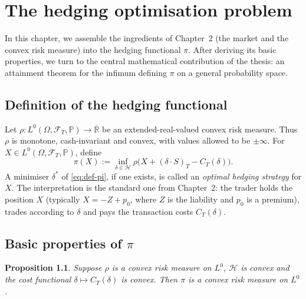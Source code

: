 \documentclass[11pt,a4paper]{report}
\numberwithin{equation}{chapter}
\theoremstyle{plain}
\newtheorem{proposition}{Proposition}[chapter]
\theoremstyle{definition}
\newcommand{\PP}{\mathbb{P}}
\newcommand{\R}{\mathbb{R}}
\newcommand{\F}{\mathcal{F}}
\newcommand{\HH}{\mathcal{H}}
\begin{document}
\setcounter{chapter}{2}

\chapter{The hedging optimisation problem}

In this chapter, we assemble the ingredients of Chapter~2 (the market and the convex risk measure) into the hedging functional $\pi$. After deriving its basic properties, we turn to the central mathematical contribution of the thesis: an attainment theorem for the infimum defining $\pi$ on a general probability space.

\section{Definition of the hedging functional}

Let $\rho\colon L^0(\Omega,\F_T,\PP)\to\overline{\R}$ be an extended-real-valued convex risk measure. Thus $\rho$ is monotone, cash-invariant and convex, with values allowed to be $\pm\infty$. For $X\in L^0(\Omega,\F_T,\PP)$, define
\begin{equation}\label{eq:def-pi}
    \pi(X):=\inf_{\delta\in\HH}\rho\bigl(X+(\delta\cdot S)_T-C_T(\delta)\bigr).
\end{equation}
A minimiser $\delta^*$ of \eqref{eq:def-pi}, if one exists, is called an \emph{optimal hedging strategy} for $X$. The interpretation is the standard one from Chapter~2: the trader holds the position $X$ (typically $X=-Z+p_0$, where $Z$ is the liability and $p_0$ is a premium), trades according to $\delta$ and pays the transaction costs $C_T(\delta)$.

\section{Basic properties of $\pi$}

\begin{proposition}\label{prop:convex}
    Suppose $\rho$ is a convex risk measure on $L^0$, $\HH$ is convex and the cost functional $\delta\mapsto C_T(\delta)$ is convex. Then $\pi$ is a convex risk measure on $L^0$.
\end{proposition}
\end{document}
